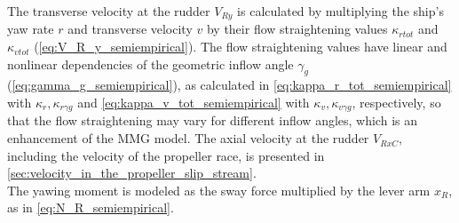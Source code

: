 The transverse velocity at the rudder $V_{Ry}$ is calculated by multiplying the ship's yaw rate $r$ and transverse velocity $v$ by their flow straightening values $\kappa_{rtot}$ and $\kappa_{vtot}$ (\autoref{eq:V_R_y_semiempirical}). The flow straightening values have linear and nonlinear dependencies of the geometric inflow angle $\gamma_g$ (\autoref{eq:gamma_g_semiempirical}), as calculated in \autoref{eq:kappa_r_tot_semiempirical} with $\kappa_r,\kappa_{r \gamma g}$ and \autoref{eq:kappa_v_tot_semiempirical} with $\kappa_v,\kappa_{v \gamma g}$, respectively, so that the flow straightening may vary for different inflow angles, which is an enhancement of the MMG model.
The axial velocity at the rudder $V_{RxC}$, including the velocity of the propeller race, is presented in \autoref{sec:velocity_in_the_propeller_slip_stream}.
\begin{equation}
    \label{eq:V_R_y_semiempirical}
    
\end{equation}
%
\begin{equation}
    \label{eq:kappa_r_tot_semiempirical}
    
\end{equation}
%
\begin{equation}
    \label{eq:kappa_v_tot_semiempirical}
    
\end{equation}
%
\begin{equation}
    \label{eq:gamma_g_semiempirical}
    
\end{equation}
The yawing moment is modeled as the sway force multiplied by the lever arm $x_R$, as in \autoref{eq:N_R_semiempirical}.
\begin{equation}
    \label{eq:N_R_semiempirical}
    
\end{equation}
%
%
